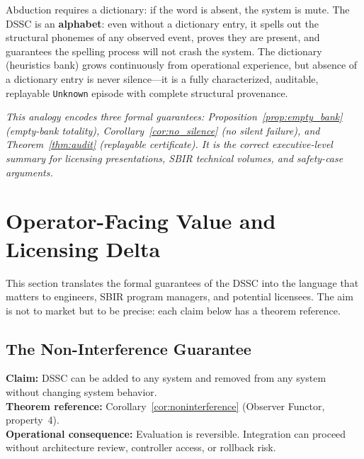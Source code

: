 \documentclass[11pt,a4paper]{article}
\theoremstyle{plain}
\theoremstyle{definition}
\theoremstyle{remark}
\begin{document}
\begin{tcolorbox}[colback=gray!5, colframe=gray!60, boxrule=0.5pt, arc=3pt,
  left=7pt, right=7pt, top=5pt, bottom=5pt,
  title={\textbf{Remark 9.2 — The Alphabet Analogy (Core Licensing Argument)}},
  fonttitle=\small\bfseries, coltitle=black]
  Abduction requires a dictionary: if the word is absent, the system is mute. The DSSC is an
  \textbf{alphabet}: even without a dictionary entry, it spells out the structural phonemes of
  any observed event, proves they are present, and guarantees the spelling process will not
  crash the system. The dictionary (heuristics bank) grows continuously from operational
  experience, but absence of a dictionary entry is never silence---it is a fully characterized,
  auditable, replayable \texttt{Unknown} episode with complete structural provenance.

  \smallskip
  \textit{This analogy encodes three formal guarantees: Proposition~\ref{prop:empty_bank}
  (empty-bank totality), Corollary~\ref{cor:no_silence} (no silent failure), and
  Theorem~\ref{thm:audit} (replayable certificate). It is the correct executive-level
  summary for licensing presentations, SBIR technical volumes, and safety-case arguments.}
\end{tcolorbox}

\section{Operator-Facing Value and Licensing Delta}
\label{sec:commercial}

This section translates the formal guarantees of the DSSC into the language that matters to
engineers, SBIR program managers, and potential licensees. The aim is not to market but to
be precise: each claim below has a theorem reference.

\subsection{The Non-Interference Guarantee}

\textbf{Claim:} DSSC can be added to any system and removed from any system without changing
system behavior. \\
\textbf{Theorem reference:} Corollary~\ref{cor:noninterference} (Observer Functor, property~4). \\
\textbf{Operational consequence:} Evaluation is reversible. Integration can proceed without
architecture review, controller access, or rollback risk.
\end{document}
